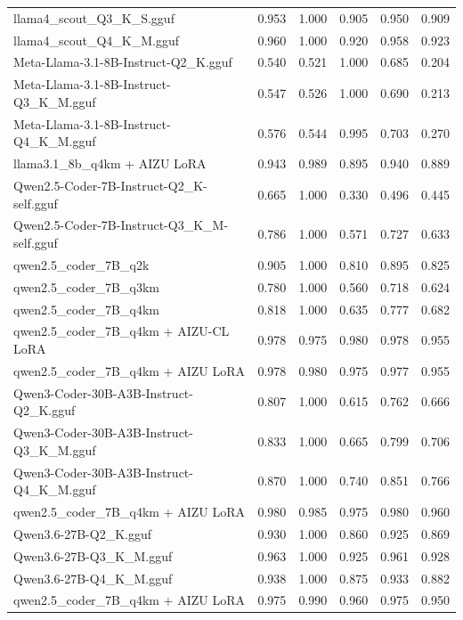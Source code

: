 \begin{table}[htbp]
{\begin{tabular}{lrrrrr}
    llama4\_scout\_Q3\_K\_S.gguf & 0.953 & 1.000 & 0.905 & 0.950 & 0.909 \\
    llama4\_scout\_Q4\_K\_M.gguf & 0.960 & 1.000 & 0.920 & 0.958 & 0.923 \\
    Meta-Llama-3.1-8B-Instruct-Q2\_K.gguf & 0.540 & 0.521 & 1.000 & 0.685 & 0.204 \\
    Meta-Llama-3.1-8B-Instruct-Q3\_K\_M.gguf & 0.547 & 0.526 & 1.000 & 0.690 & 0.213 \\
    Meta-Llama-3.1-8B-Instruct-Q4\_K\_M.gguf & 0.576 & 0.544 & 0.995 & 0.703 & 0.270 \\
    llama3.1\_8b\_q4km + AIZU LoRA & 0.943 & 0.989 & 0.895 & 0.940 & 0.889 \\
    Qwen2.5-Coder-7B-Instruct-Q2\_K-self.gguf & 0.665 & 1.000 & 0.330 & 0.496 & 0.445 \\
    Qwen2.5-Coder-7B-Instruct-Q3\_K\_M-self.gguf & 0.786 & 1.000 & 0.571 & 0.727 & 0.633 \\
    qwen2.5\_coder\_7B\_q2k & 0.905 & 1.000 & 0.810 & 0.895 & 0.825 \\
    qwen2.5\_coder\_7B\_q3km & 0.780 & 1.000 & 0.560 & 0.718 & 0.624 \\
    qwen2.5\_coder\_7B\_q4km & 0.818 & 1.000 & 0.635 & 0.777 & 0.682 \\
    qwen2.5\_coder\_7B\_q4km + AIZU-CL LoRA & 0.978 & 0.975 & 0.980 & 0.978 & \cellcolor{green!40}0.955 \\
    qwen2.5\_coder\_7B\_q4km + AIZU LoRA & 0.978 & 0.980 & 0.975 & 0.977 & \cellcolor{green!30}0.955 \\
    Qwen3-Coder-30B-A3B-Instruct-Q2\_K.gguf & 0.807 & 1.000 & 0.615 & 0.762 & 0.666 \\
    Qwen3-Coder-30B-A3B-Instruct-Q3\_K\_M.gguf & 0.833 & 1.000 & 0.665 & 0.799 & 0.706 \\
    Qwen3-Coder-30B-A3B-Instruct-Q4\_K\_M.gguf & 0.870 & 1.000 & 0.740 & 0.851 & 0.766 \\
    qwen2.5\_coder\_7B\_q4km + AIZU LoRA & 0.980 & 0.985 & 0.975 & 0.980 & \cellcolor{green!50}0.960 \\
    Qwen3.6-27B-Q2\_K.gguf & 0.930 & 1.000 & 0.860 & 0.925 & 0.869 \\
    Qwen3.6-27B-Q3\_K\_M.gguf & 0.963 & 1.000 & 0.925 & 0.961 & \cellcolor{green!10}0.928 \\
    Qwen3.6-27B-Q4\_K\_M.gguf & 0.938 & 1.000 & 0.875 & 0.933 & 0.882 \\
    qwen2.5\_coder\_7B\_q4km + AIZU LoRA & 0.975 & 0.990 & 0.960 & 0.975 & \cellcolor{green!20}0.950 \\

\end{tabular}}
\end{table}
